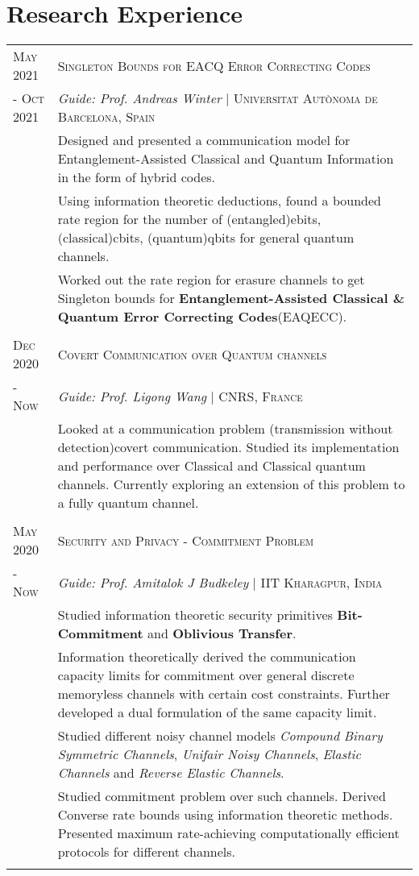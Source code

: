 \documentclass[a4paper,10pt]{article}
\begin{document}
\section{Research Experience}
\begin{tabular}{p{1.8cm}|p{15.3cm}}
	\centering \textsc{May 2021}& \textsc{Singleton Bounds for EACQ Error Correcting Codes} 
	\\ \centering \textsc{- Oct 2021}&\emph{Guide: Prof. Andreas Winter} | \small{\textsc{Universitat Aut\`onoma de Barcelona, Spain}} \\&\footnotesize{ Designed and presented a communication model for Entanglement-Assisted Classical and Quantum Information in the form of hybrid codes.} \\
	&\footnotesize{ Using information theoretic deductions, found a bounded rate region for the number of (entangled)ebits, (classical)cbits, (quantum)qbits for general quantum channels.}\\
	&\footnotesize{ Worked out the rate region for erasure channels to get Singleton bounds for \textbf{Entanglement-Assisted Classical \& Quantum Error Correcting Codes}(EAQECC).}
	\\& \\
	
\centering\textsc{Dec 2020}& \textsc{Covert Communication over Quantum channels} 
  \\\centering \textsc{- Now}&\emph{Guide: Prof. Ligong Wang} | \small{\textsc{CNRS, France}} \\&\footnotesize{ Looked at a communication problem (transmission without detection)covert communication. Studied its implementation and performance over Classical and Classical quantum channels. Currently exploring an extension of this problem to a fully quantum channel. }
  \\& \\

\centering\textsc{May 2020 }& \textsc{Security and Privacy - Commitment Problem}
  \\ \centering \textsc{- Now}&\emph{Guide: Prof. Amitalok J Budkeley} | \small{\textsc{IIT Kharagpur, India}}\\&\footnotesize{ Studied information theoretic security primitives \textbf{Bit-Commitment} and \textbf{Oblivious Transfer}.} \\
  &\footnotesize{ Information theoretically derived the communication capacity limits for commitment over general discrete memoryless channels with certain cost constraints. Further developed a dual formulation of the same capacity limit.}\\
  &\footnotesize{ Studied different noisy channel models \textit{Compound Binary Symmetric Channels}, \textit{Unifair Noisy Channels}, \textit{Elastic Channels} and \textit{Reverse Elastic Channels}.}\\
  &\footnotesize{ Studied commitment problem over such channels. Derived Converse rate bounds using information theoretic methods. Presented maximum rate-achieving computationally efficient protocols for different channels.}
  \\& \\


\end{tabular}
\end{document}
